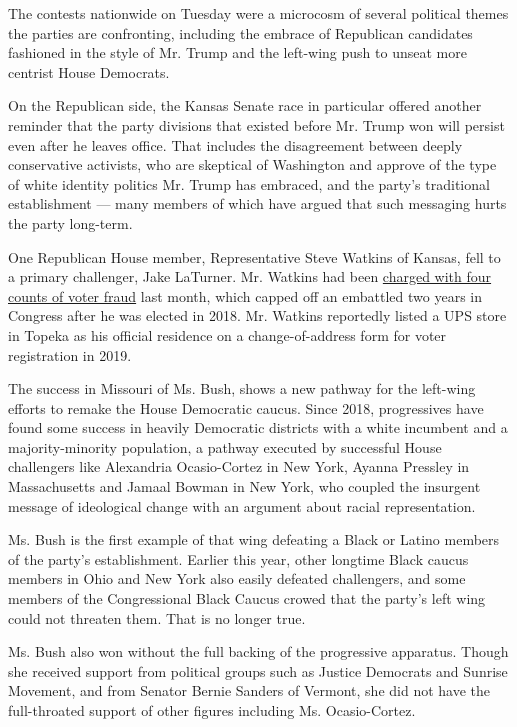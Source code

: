 The contests nationwide on Tuesday were a microcosm of several political
themes the parties are confronting, including the embrace of Republican
candidates fashioned in the style of Mr. Trump and the left-wing push to
unseat more centrist House Democrats.

On the Republican side, the Kansas Senate race in particular offered
another reminder that the party divisions that existed before Mr. Trump
won will persist even after he leaves office. That includes the
disagreement between deeply conservative activists, who are skeptical of
Washington and approve of the type of white identity politics Mr. Trump
has embraced, and the party's traditional establishment --- many members
of which have argued that such messaging hurts the party long-term.

One Republican House member, Representative Steve Watkins of Kansas,
fell to a primary challenger, Jake LaTurner. Mr. Watkins had been
\href{https://www.nytimes3xbfgragh.onion/2020/07/14/us/steve-watkins-voter-fraud-kansas.html}{charged
with four counts of voter fraud} last month, which capped off an
embattled two years in Congress after he was elected in 2018. Mr.
Watkins reportedly listed a UPS store in Topeka as his official
residence on a change-of-address form for voter registration in 2019.

The success in Missouri of Ms. Bush, shows a new pathway for the
left-wing efforts to remake the House Democratic caucus. Since 2018,
progressives have found some success in heavily Democratic districts
with a white incumbent and a majority-minority population, a pathway
executed by successful House challengers like Alexandria Ocasio-Cortez
in New York, Ayanna Pressley in Massachusetts and Jamaal Bowman in New
York, who coupled the insurgent message of ideological change with an
argument about racial representation.

Ms. Bush is the first example of that wing defeating a Black or Latino
members of the party's establishment. Earlier this year, other longtime
Black caucus members in Ohio and New York also easily defeated
challengers, and some members of the Congressional Black Caucus crowed
that the party's left wing could not threaten them. That is no longer
true.

Ms. Bush also won without the full backing of the progressive apparatus.
Though she received support from political groups such as Justice
Democrats and Sunrise Movement, and from Senator Bernie Sanders of
Vermont, she did not have the full-throated support of other figures
including Ms. Ocasio-Cortez.

